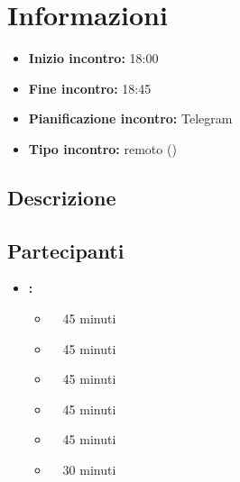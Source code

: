 \section{Informazioni}
\begin{itemize}
	\item \textbf{Inizio incontro:} 18:00
	\item \textbf{Fine incontro:} 18:45
	\item \textbf{Pianificazione incontro:} Telegram
	\item \textbf{Tipo incontro:} remoto ()
\end{itemize}

\subsection{Descrizione}
\DocDescription

\subsection{Partecipanti}

\begin{itemize}
	\item \textbf{\GroupName:}
	\begin{itemize}
		\item \tommaso \ \rightarrow\ 45 minuti
		\item \marco \ \rightarrow\ 45 minuti
		\item \sebastiano \ \rightarrow\ 45 minuti
		\item \martina \ \rightarrow\ 45 minuti
		\item \riccardo \ \rightarrow\ 45 minuti
		\item \mattia \ \rightarrow\ 30 minuti
	\end{itemize}
\end{itemize}

\clearpage